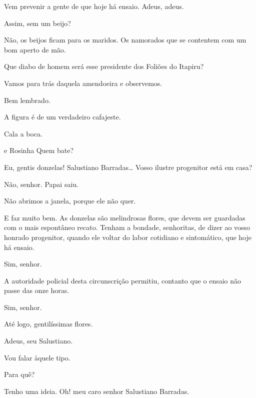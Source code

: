  Vem prevenir a
gente de que hoje há ensaio. Adeus, adeus.

 Assim, sem um
beijo?

 Não, os beijos
ficam para os maridos. Os namorados que se contentem
com um bom aperto de mão. 

 Que diabo de homem
será esse presidente dos Foliões do Itapiru?

 Vamos para
trás daquela amendoeira e observemos.

 Bem lembrado.

{}




 A figura
é de um verdadeiro cafajeste.

 Cala a boca.

 e {Rosinha}  
Quem bate?

 Eu, gentis
donzelas! Salustiano Barradas\ldots{} Vosso ilustre
progenitor está em casa?

 Não, senhor.
Papai saiu.

 Não abrimos a janela, porque ele
não quer.

 E faz muito
bem. As donzelas são melindrosas flores, que devem
ser guardadas com o mais espontâneo recato. Tenham a
bondade, senhoritas, de dizer ao vosso honrado progenitor, quando ele
voltar do labor cotidiano e sintomático, que hoje
há ensaio.

 Sim,
senhor.

 A autoridade
policial desta circunscrição permitiu, contanto que o
ensaio não passe das onze horas.

 Sim,
senhor.

 Até logo, gentilíssimas
flores.

 Adeus, seu Salustiano.

  Vou falar àquele tipo.

 Para quê?

 Tenho uma
ideia.  Oh! meu caro senhor Salustiano Barradas.

